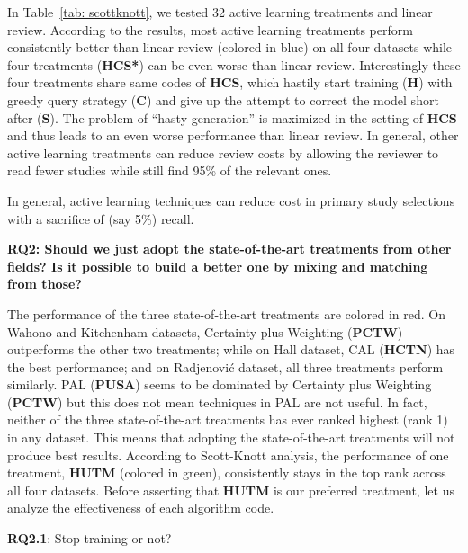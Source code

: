 \documentclass{svjour3}
\theoremstyle{break}
\begin{document}
In Table~\ref{tab: scottknott}, we tested 32 active learning treatments and linear review. According to the results, most active learning treatments perform consistently better than linear review (colored in {\setlength{\fboxsep}{1pt}\colorbox{blue!50}{blue}}) on all four datasets while four treatments (\textbf{HCS*}) can be even worse than linear review. Interestingly these four treatments share same codes of \textbf{HCS}, which hastily start training (\textbf{H}) with greedy query strategy (\textbf{C}) and give up the attempt to correct the model short after (\textbf{S}). The problem of ``hasty generation'' is maximized in the setting of \textbf{HCS} and thus leads to an even worse performance than linear review. In general, other active learning treatments can reduce review costs by allowing the reviewer to read fewer studies while still find 95\% of the relevant ones.

\begin{lesson}
    In general, active learning techniques can reduce cost in primary study selections with a sacrifice of (say 5\%) recall.
\end{lesson}




{\bf RQ2: Should we just adopt the state-of-the-art treatments from other fields? Is it possible to build a better one by mixing and matching from those?}

The performance of the three state-of-the-art treatments are colored in {\setlength{\fboxsep}{1pt}\colorbox{red!30}{red}}. On Wahono and Kitchenham datasets, Certainty plus Weighting (\textbf{PCTW}) outperforms the other two treatments; while on Hall dataset, CAL (\textbf{HCTN}) has the best performance; and on Radjenovi{\'c} dataset, all three treatments perform similarly. PAL (\textbf{PUSA}) seems to be dominated by Certainty plus Weighting (\textbf{PCTW}) but this does not mean techniques in PAL are not useful. In fact, neither of the three state-of-the-art treatments has ever ranked highest (rank 1) in any dataset. This means that adopting the state-of-the-art treatments will not produce best results. According to Scott-Knott analysis, the performance of one treatment, \textbf{HUTM} (colored in {\setlength{\fboxsep}{1pt}\colorbox{green!40}{green}}), consistently stays in the top rank across all four datasets. Before asserting that \textbf{HUTM} is our preferred treatment, let us analyze the effectiveness of each algorithm code.

\textbf{RQ2.1}: Stop training or not?
\end{document}
